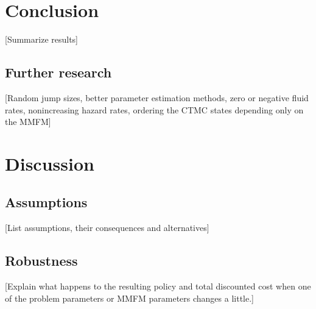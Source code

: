 \documentclass[a4paper]{thesis}
\theoremstyle{definition}
\begin{document}
\chapter{Conclusion}\label{chapter:Conclusion}
[Summarize results]
\section{Further research}
[Random jump sizes, better parameter estimation methods, zero or negative fluid rates, nonincreasing hazard rates, ordering the CTMC states depending only on the MMFM]

\chapter{Discussion}\label{chapter:discussion}
\section{Assumptions}
[List assumptions, their consequences and alternatives]
\section{Robustness}
[Explain what happens to the resulting policy and total discounted cost when one of the problem parameters or MMFM parameters changes a little.]



\end{document}
